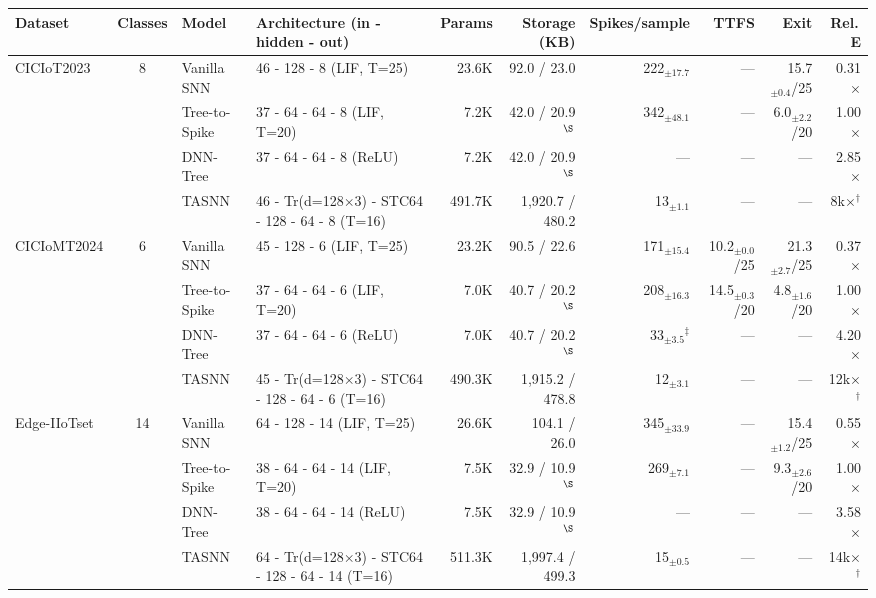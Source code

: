 \begin{table}[!ht]
\label{tab:architecture_iot}
{\scriptsize
\begin{tabular}{l c l l r r r r r r}
\toprule
\textbf{Dataset} & \textbf{Classes} & \textbf{Model} & \textbf{Architecture (in - hidden - out)} & \textbf{Params} & \textbf{Storage (KB)} & \textbf{Spikes/sample} & \textbf{TTFS} & \textbf{Exit} & \textbf{Rel.\,E} \\
\midrule
\multirow{4}{*}{CICIoT2023} & \multirow{4}{*}{8}
  & Vanilla SNN   & 46 - 128 - 8 (LIF, T=25) & 23.6K & 92.0 / 23.0 & 222$_{\pm17.7}$ & --- & 15.7$_{\pm0.4}$/25 & 0.31$\times$ \\
& & Tree-to-Spike & 37 - 64 - 64 - 8 (LIF, T=20) & 7.2K & 42.0 / 20.9$^{\S}$ & 342$_{\pm48.1}$ & --- & 6.0$_{\pm2.2}$/20 & 1.00$\times$ \\
& & DNN-Tree      & 37 - 64 - 64 - 8 (ReLU) & 7.2K & 42.0 / 20.9$^{\S}$ & --- & --- & --- & 2.85$\times$ \\
& & TASNN         & 46 - Tr(d=128$\times$3) - STC64 - 128 - 64 - 8 (T=16) & 491.7K & 1,920.7 / 480.2 & 13$_{\pm1.1}$ & --- & --- & 8k$\times$$^\dagger$ \\
\midrule
\multirow{4}{*}{CICIoMT2024} & \multirow{4}{*}{6}
  & Vanilla SNN   & 45 - 128 - 6 (LIF, T=25) & 23.2K & 90.5 / 22.6 & 171$_{\pm15.4}$ & 10.2$_{\pm0.0}$/25 & 21.3$_{\pm2.7}$/25 & 0.37$\times$ \\
& & Tree-to-Spike & 37 - 64 - 64 - 6 (LIF, T=20) & 7.0K & 40.7 / 20.2$^{\S}$ & 208$_{\pm16.3}$ & 14.5$_{\pm0.3}$/20 & 4.8$_{\pm1.6}$/20 & 1.00$\times$ \\
& & DNN-Tree      & 37 - 64 - 64 - 6 (ReLU) & 7.0K & 40.7 / 20.2$^{\S}$ & 33$_{\pm3.5}$$^\ddagger$ & --- & --- & 4.20$\times$ \\
& & TASNN         & 45 - Tr(d=128$\times$3) - STC64 - 128 - 64 - 6 (T=16) & 490.3K & 1,915.2 / 478.8 & 12$_{\pm3.1}$ & --- & --- & 12k$\times$$^\dagger$ \\
\midrule
\multirow{4}{*}{Edge-IIoTset} & \multirow{4}{*}{14}
  & Vanilla SNN   & 64 - 128 - 14 (LIF, T=25) & 26.6K & 104.1 / 26.0 & 345$_{\pm33.9}$ & --- & 15.4$_{\pm1.2}$/25 & 0.55$\times$ \\
& & Tree-to-Spike & 38 - 64 - 64 - 14 (LIF, T=20) & 7.5K & 32.9 / 10.9$^{\S}$ & 269$_{\pm7.1}$ & --- & 9.3$_{\pm2.6}$/20 & 1.00$\times$ \\
& & DNN-Tree      & 38 - 64 - 64 - 14 (ReLU) & 7.5K & 32.9 / 10.9$^{\S}$ & --- & --- & --- & 3.58$\times$ \\
& & TASNN         & 64 - Tr(d=128$\times$3) - STC64 - 128 - 64 - 14 (T=16) & 511.3K & 1,997.4 / 499.3 & 15$_{\pm0.5}$ & --- & --- & 14k$\times$$^\dagger$ \\

\end{tabular}}
\end{table}
